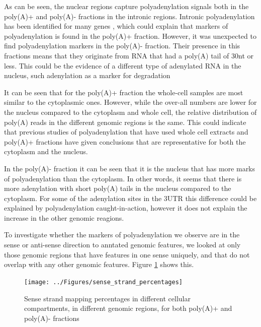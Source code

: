 \documentclass[a4paper]{article}
\begin{document}

As can be seen, the nuclear regions capture polyadenylation signals both in the
poly(A)+ and poly(A)- fractions in the intronic regions. Intronic
polyadenylation has been identified for many genes \cite{tian_widespread_2007},
which could explain that markers of polyadenylation is found in the poly(A)+
fraction.  However, it was unexpected to find polyadenylation markers in the
poly(A)- fraction. Their presence in this fractions means that they originate
from RNA that had a poly(A) tail of 30nt or less. This could be the
evidence of a different type of adenylated RNA in the nucleus, such adenylation
as a marker for degradation \cite{slomovic_addition_2010}

It can be seen that for the poly(A)+ fraction the whole-cell samples are most
similar to the cytoplasmic ones. However, while the over-all numbers are lower for
the nucleus compared to the cytoplasm and whole cell, the relative distribution of
poly(A) reads in the different genomic regions is the same. This could indicate that
previous studies of polyadenylation that have used whole cell extracts and
poly(A)+ fractions have given conclusions that are representative for both the
cytoplasm and the nucleus.

In the poly(A)- fraction it can be seen that it is the nucleus that has more
marks of polyadenylation than the cytoplasm. In other words, it seems that
there is more adenylation with short poly(A) tails in the nucleus compared to
the cytoplasm. For some of the adenylation sites in the 3UTR this difference
could be explained by polyadenylation caught-in-action, however it does not
explain the increase in the other genomic reagions.

To investigate whether the markers of polyadenylation we observe are in the
sense or anti-sense direction to anntated genomic features, we looked at only
those genomic regions that have features in one sense uniquely, and that do not
overlap with any other genomic features. Figure \ref{fig:sense} shows this.
\begin{figure}[h]
	\centering
		\texttt{[image: ../Figures/sense\_strand\_percentages]}
	\caption{Sense strand mapping percentages in different cellular compartments, in
	different genomic regions, for both poly(A)+ and poly(A)- fractions}
	\label{fig:sense}
\end{figure}
\end{document}
